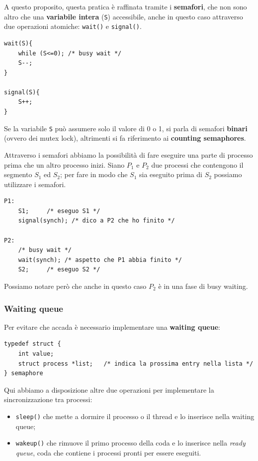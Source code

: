 A questo proposito, questa pratica è raffinata tramite i \textbf{semafori}, che non sono altro che una \textbf{variabile intera} (\texttt{S}) accessibile, anche in questo caso attraverso due operazioni atomiche: \texttt{wait()} e \texttt{signal()}.
\begin{lstlisting}
wait(S){
    while (S<=0); /* busy wait */
    S--;
}

signal(S){
    S++;
}
\end{lstlisting}
Se la variabile \texttt{S} può assumere solo il valore di 0 o 1, si parla di semafori \textbf{binari} (ovvero dei mutex lock), altrimenti si fa riferimento ai \textbf{counting semaphores}. 

Attraverso i semafori abbiamo la possibilità di fare eseguire una parte di processo prima che un altro processo inizi. Siano $P_1$ e $P_2$ due processi che contengono il segmento $S_1$ ed $S_2$; per fare in modo che $S_1$ sia eseguito prima di $S_2$ possiamo utilizzare i semafori.
\begin{lstlisting}
P1:
    S1;     /* eseguo S1 */
    signal(synch); /* dico a P2 che ho finito */

P2:
    /* busy wait */
    wait(synch); /* aspetto che P1 abbia finito */
    S2;     /* eseguo S2 */
\end{lstlisting}
Possiamo notare però che anche in questo caso $P_2$ è in una fase di busy waiting.

\subsubsection{Waiting queue}
Per evitare che accada è necessario implementare una \textbf{waiting queue}:
\begin{lstlisting}[caption={Struttura del semaforo con waiting queue}]
typedef struct {
    int value;
    struct process *list;   /* indica la prossima entry nella lista */
} semaphore
\end{lstlisting}
Qui abbiamo a disposizione altre due operazioni per implementare la sincronizzazione tra processi:
\vspace{-5px}
\begin{itemize}
\setlength{\itemsep}{-.15 em}
    \item \texttt{sleep()} che mette a dormire il processo o il thread e lo inserisce nella waiting queue;
    \item \texttt{wakeup()} che rimuove il primo processo della coda e lo inserisce nella \textit{ready queue}, coda che contiene i processi pronti per essere eseguiti.
\end{itemize}

